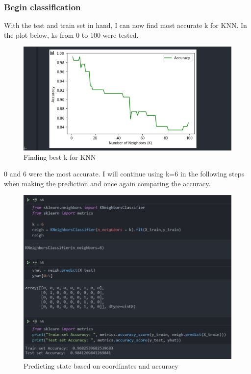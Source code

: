\subsubsection{Begin classification}
With the test and train set in hand, I can now find most accurate k for KNN. In the plot below, ks from 0 to 100 were tested.
\begin{figure}[H]
	\includegraphics[width=\textwidth]{Bilder/finding_best_k.PNG}
	\caption{Finding best k for KNN}
\end{figure}
0 and 6 were the most accurate. I will continue using k=6 in the following steps when making the prediction and once again comparing the accuracy.
\begin{figure}[H]
	\includegraphics[width=\textwidth]{Bilder/predict_state.PNG}
	\caption{Predicting state based on coordinates and accuracy}
\end{figure}
